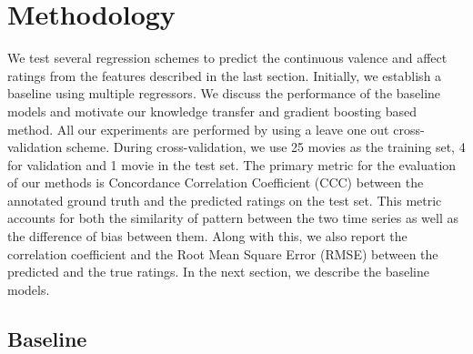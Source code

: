 \documentclass{article}
\begin{document}

\section{Methodology}

We test several regression schemes to predict the continuous valence and affect ratings from the features described in the last section.
Initially, we establish a baseline using multiple regressors.
We discuss the performance of the baseline models and motivate our knowledge transfer and gradient boosting based method.
All our experiments are performed by using a leave one out cross-validation scheme.
During cross-validation, we use 25 movies as the training set, 4 for validation and 1 movie in the test set.
The primary metric for the evaluation of our methods is Concordance Correlation Coefficient (CCC) \cite{} between the annotated ground truth and the predicted ratings on the test set.
This metric accounts for both the similarity of pattern between the two time series as well as the difference of bias between them. 
Along with this, we also report the correlation coefficient and the Root Mean Square Error (RMSE) between the predicted and the true ratings.
In the next section, we describe the baseline models.

\subsection{Baseline}
\end{document}
